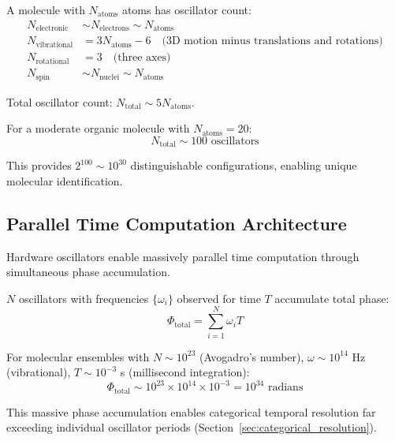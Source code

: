 \begin{proposition}
\label{prop:molecular_oscillators}
A molecule with $N_{\text{atoms}}$ atoms has oscillator count:
\begin{align}
N_{\text{electronic}} &\sim N_{\text{electrons}} \sim N_{\text{atoms}} \\
N_{\text{vibrational}} &= 3N_{\text{atoms}} - 6 \quad \text{(3D motion minus translations and rotations)} \\
N_{\text{rotational}} &= 3 \quad \text{(three axes)} \\
N_{\text{spin}} &\sim N_{\text{nuclei}} \sim N_{\text{atoms}}
\end{align}

Total oscillator count: $N_{\text{total}} \sim 5N_{\text{atoms}}$.

For a moderate organic molecule with $N_{\text{atoms}} = 20$:
\begin{equation}
N_{\text{total}} \sim 100 \text{ oscillators}
\end{equation}

This provides $2^{100} \sim 10^{30}$ distinguishable configurations, enabling unique molecular identification.
\end{proposition}

\subsection{Parallel Time Computation Architecture}

Hardware oscillators enable massively parallel time computation through simultaneous phase accumulation.

\begin{theorem}
\label{thm:parallel_phase}
$N$ oscillators with frequencies $\{\omega_i\}$ observed for time $T$ accumulate total phase:
\begin{equation}
\Phi_{\text{total}} = \sum_{i=1}^{N} \omega_i T
\end{equation}

For molecular ensembles with $N \sim 10^{23}$ (Avogadro's number), $\omega \sim 10^{14}$ Hz (vibrational), $T \sim 10^{-3}$ s (millisecond integration):
\begin{equation}
\Phi_{\text{total}} \sim 10^{23} \times 10^{14} \times 10^{-3} = 10^{34} \text{ radians}
\end{equation}
\end{theorem}

This massive phase accumulation enables categorical temporal resolution far exceeding individual oscillator periods (Section~\ref{sec:categorical_resolution}).

